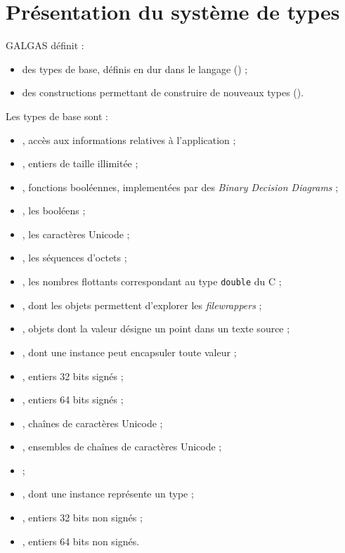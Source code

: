 
\chapter{Présentation du système de types}

GALGAS définit :
\begin{itemize}
\item des types de base, définis en dur dans le langage () ;
\item des constructions permettant de construire de nouveaux types ().
\end{itemize}





Les types de base sont :
\begin{itemize}
\item {}, accès aux informations relatives à l'application ;
\item {}, entiers de taille illimitée ;
\item {}, fonctions booléennes, implementées par des \emph{Binary Decision Diagrams} ;
\item {}, les booléens ;
\item {}, les caractères Unicode ;
\item {}, les séquences d'octets ;
\item {}, les nombres flottants correspondant au type \texttt{double} du C ;
\item {}, dont les objets permettent d'explorer les \emph{filewrappers} ;
\item {}, objets dont la valeur désigne un point dans un texte source ;
\item {}, dont une instance peut encapsuler toute valeur ;
\item {}, entiers 32 bits signés ;
\item {}, entiers 64 bits signés ;
\item {}, chaînes de caractères Unicode ;
\item {}, ensembles de chaînes de caractères Unicode ;
\item {} ;
\item {}, dont une instance représente un type ;
\item {}, entiers 32 bits non signés ;
\item {}, entiers 64 bits non signés.
\end{itemize}





